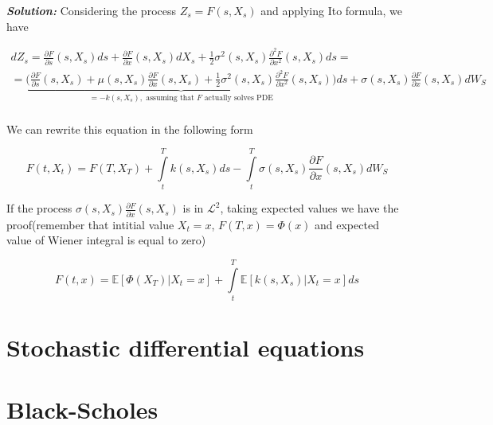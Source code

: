 \documentclass[a4paper, 12pt]{article}
\theoremstyle{problemstyle}
\newenvironment{solution}
{\textit{\textbf{Solution:}}}
{}
\newcommand{\E}{\mathbb{E}}
\begin{document}
\begin{solution}
Considering the process $Z_s = F(s, X_s)$ and applying Ito formula, we have

\begin{multline*}
dZ_s = \frac{\partial F }{\partial s} (s, X_s) ds + \frac{\partial F }{\partial x} (s, X_s) dX_s + \frac{1}{2} \sigma^2(s, X_s) \frac{\partial^2 F}{\partial x^2} (s, X_s)ds = \\ =\underbrace{\Big( \frac{\partial F }{\partial s} (s, X_s) + \mu(s, X_s) \frac{\partial F }{\partial x} (s, X_s)  + \frac{1}{2} \sigma^2(s, X_s) \frac{\partial^2 F}{\partial x^2} (s, X_s)\Big)}_{= -k(s, X_s), \text{ assuming that $F$ actually solves PDE} }ds + \sigma(s, X_s)\frac{\partial F }{\partial x} (s, X_s) dW_S \\
\end{multline*}

We can rewrite this equation in the following form

$$
F(t, X_t) = F(T, X_T) + \int\limits_{t}^{T}k(s,X_s)ds - \int\limits_{t}^{T}\sigma(s, X_s)\frac{\partial F }{\partial x} (s, X_s) dW_S
$$

If the process $\sigma(s, X_s)\frac{\partial F }{\partial x} (s, X_s)$ is in $\mathcal{L}^2 $, taking expected values we have the proof(remember that intitial value $X_t = x$, $F(T,x) = \Phi(x)$ and expected value of Wiener integral is equal to zero)

$$
F(t,x) = \E[\Phi(X_T)|X_t = x] + \int\limits_{t}^{T} \E[k(s,X_s)|X_t = x]ds
$$
\end{solution}




\section{Stochastic differential equations}






\section{Black-Scholes}
\end{document}
